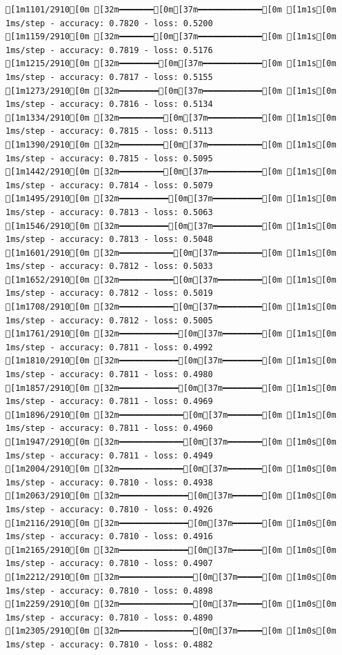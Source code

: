 \documentclass[
  letterpaper,
  DIV=11,
  numbers=noendperiod]{scrartcl}
\begin{document}
\begin{verbatim}
[1m1101/2910[0m [32m━━━━━━━[0m[37m━━━━━━━━━━━━━[0m [1m1s[0m 1ms/step - accuracy: 0.7820 - loss: 0.5200
[1m1159/2910[0m [32m━━━━━━━[0m[37m━━━━━━━━━━━━━[0m [1m1s[0m 1ms/step - accuracy: 0.7819 - loss: 0.5176
[1m1215/2910[0m [32m━━━━━━━━[0m[37m━━━━━━━━━━━━[0m [1m1s[0m 1ms/step - accuracy: 0.7817 - loss: 0.5155
[1m1273/2910[0m [32m━━━━━━━━[0m[37m━━━━━━━━━━━━[0m [1m1s[0m 1ms/step - accuracy: 0.7816 - loss: 0.5134
[1m1334/2910[0m [32m━━━━━━━━━[0m[37m━━━━━━━━━━━[0m [1m1s[0m 1ms/step - accuracy: 0.7815 - loss: 0.5113
[1m1390/2910[0m [32m━━━━━━━━━[0m[37m━━━━━━━━━━━[0m [1m1s[0m 1ms/step - accuracy: 0.7815 - loss: 0.5095
[1m1442/2910[0m [32m━━━━━━━━━[0m[37m━━━━━━━━━━━[0m [1m1s[0m 1ms/step - accuracy: 0.7814 - loss: 0.5079
[1m1495/2910[0m [32m━━━━━━━━━━[0m[37m━━━━━━━━━━[0m [1m1s[0m 1ms/step - accuracy: 0.7813 - loss: 0.5063
[1m1546/2910[0m [32m━━━━━━━━━━[0m[37m━━━━━━━━━━[0m [1m1s[0m 1ms/step - accuracy: 0.7813 - loss: 0.5048
[1m1601/2910[0m [32m━━━━━━━━━━━[0m[37m━━━━━━━━━[0m [1m1s[0m 1ms/step - accuracy: 0.7812 - loss: 0.5033
[1m1652/2910[0m [32m━━━━━━━━━━━[0m[37m━━━━━━━━━[0m [1m1s[0m 1ms/step - accuracy: 0.7812 - loss: 0.5019
[1m1708/2910[0m [32m━━━━━━━━━━━[0m[37m━━━━━━━━━[0m [1m1s[0m 1ms/step - accuracy: 0.7812 - loss: 0.5005
[1m1761/2910[0m [32m━━━━━━━━━━━━[0m[37m━━━━━━━━[0m [1m1s[0m 1ms/step - accuracy: 0.7811 - loss: 0.4992
[1m1810/2910[0m [32m━━━━━━━━━━━━[0m[37m━━━━━━━━[0m [1m1s[0m 1ms/step - accuracy: 0.7811 - loss: 0.4980
[1m1857/2910[0m [32m━━━━━━━━━━━━[0m[37m━━━━━━━━[0m [1m1s[0m 1ms/step - accuracy: 0.7811 - loss: 0.4969
[1m1896/2910[0m [32m━━━━━━━━━━━━━[0m[37m━━━━━━━[0m [1m1s[0m 1ms/step - accuracy: 0.7811 - loss: 0.4960
[1m1947/2910[0m [32m━━━━━━━━━━━━━[0m[37m━━━━━━━[0m [1m0s[0m 1ms/step - accuracy: 0.7811 - loss: 0.4949
[1m2004/2910[0m [32m━━━━━━━━━━━━━[0m[37m━━━━━━━[0m [1m0s[0m 1ms/step - accuracy: 0.7810 - loss: 0.4938
[1m2063/2910[0m [32m━━━━━━━━━━━━━━[0m[37m━━━━━━[0m [1m0s[0m 1ms/step - accuracy: 0.7810 - loss: 0.4926
[1m2116/2910[0m [32m━━━━━━━━━━━━━━[0m[37m━━━━━━[0m [1m0s[0m 1ms/step - accuracy: 0.7810 - loss: 0.4916
[1m2165/2910[0m [32m━━━━━━━━━━━━━━[0m[37m━━━━━━[0m [1m0s[0m 1ms/step - accuracy: 0.7810 - loss: 0.4907
[1m2212/2910[0m [32m━━━━━━━━━━━━━━━[0m[37m━━━━━[0m [1m0s[0m 1ms/step - accuracy: 0.7810 - loss: 0.4898
[1m2259/2910[0m [32m━━━━━━━━━━━━━━━[0m[37m━━━━━[0m [1m0s[0m 1ms/step - accuracy: 0.7810 - loss: 0.4890
[1m2305/2910[0m [32m━━━━━━━━━━━━━━━[0m[37m━━━━━[0m [1m0s[0m 1ms/step - accuracy: 0.7810 - loss: 0.4882

\end{verbatim}
\end{document}
